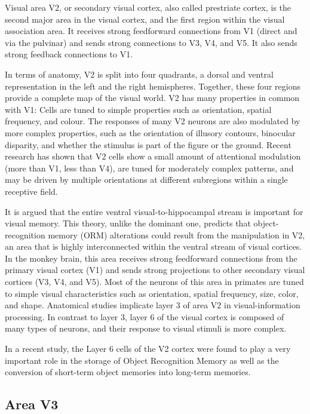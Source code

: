 Visual area V2, or secondary visual cortex, also called prestriate cortex, is the second major area in the visual cortex, and the first region within the visual association area. It receives strong feedforward connections from V1 (direct and via the pulvinar) and sends strong connections to V3, V4, and V5. It also sends strong feedback connections to V1.

In terms of anatomy, V2 is split into four quadrants, a dorsal and ventral representation in the left and the right hemispheres. Together, these four regions provide a complete map of the visual world. V2 has many properties in common with V1: Cells are tuned to simple properties such as orientation, spatial frequency, and colour. The responses of many V2 neurons are also modulated by more complex properties, such as the orientation of illusory contours, binocular disparity, and whether the stimulus is part of the figure or the ground. Recent research has shown that V2 cells show a small amount of attentional modulation (more than V1, less than V4), are tuned for moderately complex patterns, and may be driven by multiple orientations at different subregions within a single receptive field.

It is argued that the entire ventral visual-to-hippocampal stream is important for visual memory. This theory, unlike the dominant one, predicts that object-recognition memory (ORM) alterations could result from the manipulation in V2, an area that is highly interconnected within the ventral stream of visual cortices. In the monkey brain, this area receives strong feedforward connections from the primary visual cortex (V1) and sends strong projections to other secondary visual cortices (V3, V4, and V5). Most of the neurons of this area in primates are tuned to simple visual characteristics such as orientation, spatial frequency, size, color, and shape. Anatomical studies implicate layer 3 of area V2 in visual-information processing. In contrast to layer 3, layer 6 of the visual cortex is composed of many types of neurons, and their response to visual stimuli is more complex.

In a recent study, the Layer 6 cells of the V2 cortex were found to play a very important role in the storage of Object Recognition Memory as well as the conversion of short-term object memories into long-term memories.

\hypertarget{area-v3}{%
\subsection{Area V3}\label{area-v3}}

